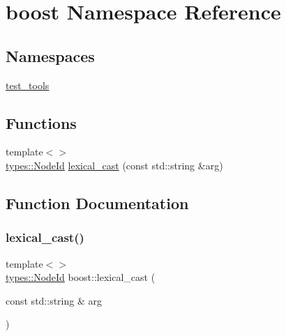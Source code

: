 \hypertarget{namespaceboost}{}\section{boost Namespace Reference}
\label{namespaceboost}
\subsection*{Namespaces}
\begin{DoxyCompactItemize}
\item 
 \mbox{\hyperlink{namespaceboost_1_1test__tools}{test\+\_\+tools}}
\end{DoxyCompactItemize}
\subsection*{Functions}
\begin{DoxyCompactItemize}
\item 
{\footnotesize template$<$$>$ }\\\mbox{\hyperlink{classtypes_1_1_node_id}{types\+::\+Node\+Id}} \mbox{\hyperlink{namespaceboost_a3399392f0fe37137aa1b8f7630158080}{lexical\+\_\+cast}} (const std\+::string \&arg)
\end{DoxyCompactItemize}


\subsection{Function Documentation}
\mbox{\label{namespaceboost_a3399392f0fe37137aa1b8f7630158080}} 
\subsubsection{\texorpdfstring{lexical\_cast()}{lexical\_cast()}}
{\footnotesize\ttfamily template$<$$>$ \\
\mbox{\hyperlink{classtypes_1_1_node_id}{types\+::\+Node\+Id}} boost\+::lexical\+\_\+cast (\begin{DoxyParamCaption}\item[{const std\+::string \&}]{arg }\end{DoxyParamCaption})\hspace{0.3cm}{\ttfamily [inline]}}

